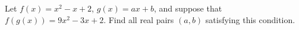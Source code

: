 Let $f(x)=x^{2}-x+2$, $g(x)=ax+b$, and suppose that $f(g(x))=9x^{2}-3x+2$. Find all real pairs $(a,b)$ satisfying this condition.
